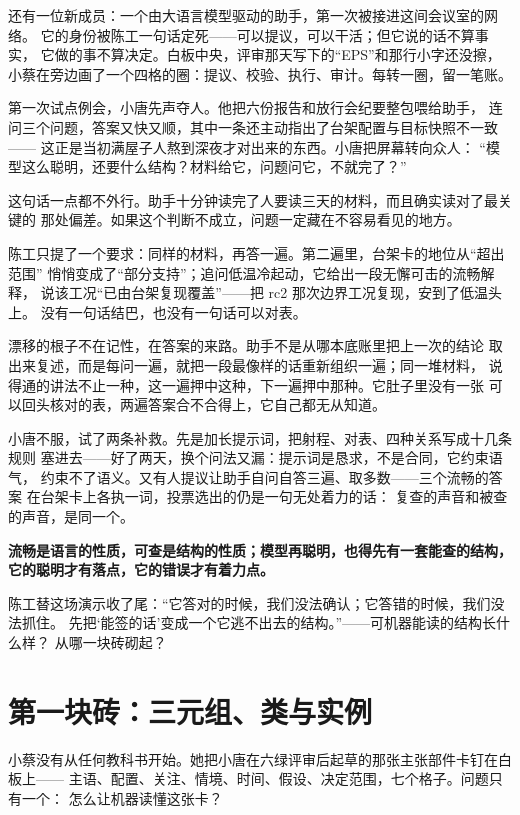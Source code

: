 还有一位新成员：一个由大语言模型驱动的助手，第一次被接进这间会议室的网络。
它的身份被陈工一句话定死——可以提议，可以干活；但它说的话不算事实，
它做的事不算决定。白板中央，评审那天写下的“EPS”和那行小字还没擦，
小蔡在旁边画了一个四格的圈：提议、校验、执行、审计。每转一圈，留一笔账。

第一次试点例会，小唐先声夺人。他把六份报告和放行会纪要整包喂给助手，
连问三个问题，答案又快又顺，其中一条还主动指出了台架配置与目标快照不一致——
这正是当初满屋子人熬到深夜才对出来的东西。小唐把屏幕转向众人：
“模型这么聪明，还要什么结构？材料给它，问题问它，不就完了？”

这句话一点都不外行。助手十分钟读完了人要读三天的材料，而且确实读对了最关键的
那处偏差。如果这个判断不成立，问题一定藏在不容易看见的地方。

陈工只提了一个要求：同样的材料，再答一遍。第二遍里，台架卡的地位从“超出范围”
悄悄变成了“部分支持”；追问低温冷起动，它给出一段无懈可击的流畅解释，
说该工况“已由台架复现覆盖”——把 rc2 那次边界工况复现，安到了低温头上。
没有一句话结巴，也没有一句话可以对表。

漂移的根子不在记性，在答案的来路。助手不是从哪本底账里把上一次的结论
取出来复述，而是每问一遍，就把一段最像样的话重新组织一遍；同一堆材料，
说得通的讲法不止一种，这一遍押中这种，下一遍押中那种。它肚子里没有一张
可以回头核对的表，两遍答案合不合得上，它自己都无从知道。

小唐不服，试了两条补救。先是加长提示词，把射程、对表、四种关系写成十几条规则
塞进去——好了两天，换个问法又漏：提示词是恳求，不是合同，它约束语气，
约束不了语义。又有人提议让助手自问自答三遍、取多数——三个流畅的答案
在台架卡上各执一词，投票选出的仍是一句无处着力的话：
复查的声音和被查的声音，是同一个。

\textbf{流畅是语言的性质，可查是结构的性质；模型再聪明，也得先有一套能查的结构，它的聪明才有落点，它的错误才有着力点。}

陈工替这场演示收了尾：“它答对的时候，我们没法确认；它答错的时候，我们没法抓住。
先把‘能签的话’变成一个它逃不出去的结构。”——可机器能读的结构长什么样？
从哪一块砖砌起？

\section{第一块砖：三元组、类与实例}

小蔡没有从任何教科书开始。她把小唐在六绿评审后起草的那张主张部件卡钉在白板上——
主语、配置、关注、情境、时间、假设、决定范围，七个格子。问题只有一个：
怎么让机器读懂这张卡？

